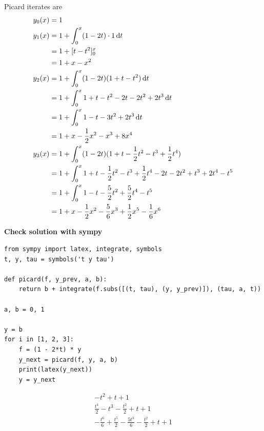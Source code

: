 \documentclass[12pt]{article}
\begin{document}
Picard iterates are
\begin{align*}
  y_0(x) &= 1\\
  y_1(x) &= 1 + \int_0^x (1 - 2t)\cdot 1 \dt\\
         &= 1 + [t - t^2]_0^x\\
         &= 1 + x - x^2\\
  y_2(x) &= 1 + \int_0^x (1 - 2t)(1 + t - t^2) \dt\\
         &= 1 + \int_0^x 1 + t - t^2 -2t -2t^2 + 2t^3 \dt\\
         &= 1 + \int_0^x 1 - t - 3t^2 + 2t^3 \dt\\
         &= 1 + x - \frac{1}{2}x^2 - x^3 + 8x^4\\
  y_3(x) &= 1 + \int_0^x (1 - 2t)(1 + t - \frac{1}{2}t^2 - t^3 + \frac{1}{2}t^4)\\
         &= 1 + \int_0^x 1 + t - \frac{1}{2}t^2 - t^3 + \frac{1}{2}t^4 - 2t - 2t^2 + t^3 + 2t^4 - t^5\\
         &= 1 + \int_0^x 1 - t - \frac{5}{2}t^2 + \frac{5}{2}t^4 - t^5\\
         &= 1 + x - \frac{1}{2}x^2 - \frac{5}{6}x^3 + \frac{1}{2}x^5 - \frac{1}{6}x^6
\end{align*}

\begin{mdframed}
\textbf{Check solution with sympy}
\begin{verbatim}
from sympy import latex, integrate, symbols
t, y, tau = symbols('t y tau')

def picard(f, y_prev, a, b):
    return b + integrate(f.subs([(t, tau), (y, y_prev)]), (tau, a, t))

a, b = 0, 1

y = b
for i in [1, 2, 3]:
    f = (1 - 2*t) * y
    y_next = picard(f, y, a, b)
    print(latex(y_next))
    y = y_next
\end{verbatim}
\begin{align*}
  - t^{2} + t + 1\\
  \frac{t^{4}}{2} - t^{3} - \frac{t^{2}}{2} + t + 1\\
  - \frac{t^{6}}{6} + \frac{t^{5}}{2} - \frac{5 t^{3}}{6} - \frac{t^{2}}{2} + t + 1\\
\end{align*}
\end{mdframed}
\end{document}

